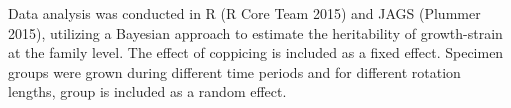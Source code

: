 Data analysis was conducted in R (R Core Team 2015) and JAGS (Plummer 2015), utilizing a Bayesian approach to estimate the heritability of growth-strain at the family level. The effect of coppicing is included as a fixed effect. Specimen groups were grown during different time periods and for different rotation lengths, group is included as a random effect. 